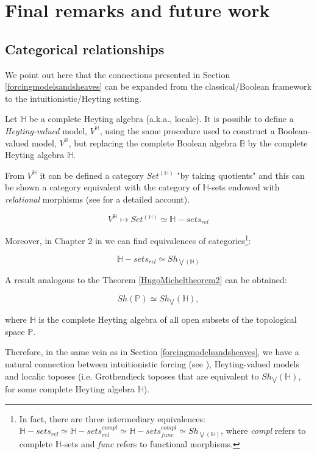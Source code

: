 \documentclass[10pt,longbibliography]{article}
\newcommand{\Po}{\mathbb{P}}
\newcommand{\B}{\mathbb{B}}
\newcommand{\He}{\mathbb{H}}
\begin{document}
\section{Final remarks and future work}\label{futureworks}



\subsection{Categorical relationships }

We point out here that the connections presented in Section \ref{forcingmodelsandsheaves} can be expanded from the classical/Boolean framework to the 
intuitionistic/Heyting  setting.



Let $\He$ be a complete Heyting algebra (a.k.a., locale). It is possible to define a \emph{Heyting-valued} model, $V^{\He}$, using the same procedure used to construct a Boolean-valued model, $V^\B$, but replacing the complete Boolean algebra $\B$ by the complete Heyting algebra $\He$.

From  $V^\He$  it can be defined a category $Set^{(\He)}$  "by taking quotients" and this can be shown a category equivalent with the category  of $\He$-sets endowed with {\em relational} morphisms (see \cite{Alvim22} for a detailed account).

$$V^\He \mapsto Set^{(\He)} \simeq \mathbb{H}-sets_{rel}$$




Moreover, in Chapter 2 in \cite{Borceux94} we can find equivalences of categories\footnote{In fact, there are three intermediary equivalences: $\mathbb{H}-sets_{rel} \simeq \mathbb{H}-sets_{rel}^{compl}  \simeq \mathbb{H}-sets_{func}^{compl} \simeq Sh_{\bigvee(\mathbb{H})}$, where {\em compl} refers to complete $\mathbb{H}$-sets and {\em func} refers to functional morphisms.}:

 $$\mathbb{H}-sets_{rel} \simeq Sh_{\bigvee(\mathbb{H})}$$




A result analogous to the Theorem \ref{HugoMicheltheorem2} can be obtained:

    $$Sh(\Po) \simeq Sh_{\bigvee}(\mathbb H),$$
    
    where $\mathbb H$ is the complete Heyting algebra of all open subsets of the topological space $\mathbb P$. 


Therefore, in the same vein as in Section \ref{forcingmodelsandsheaves}, we have a natural connection between intuitionistic forcing (see \cite{Mariano05}), Heyting-valued models and localic toposes (i.e. Grothendieck toposes that are equivalent to $Sh_{\bigvee}(\mathbb H)$, for some complete Heyting algebra $\He$). 
\end{document}
